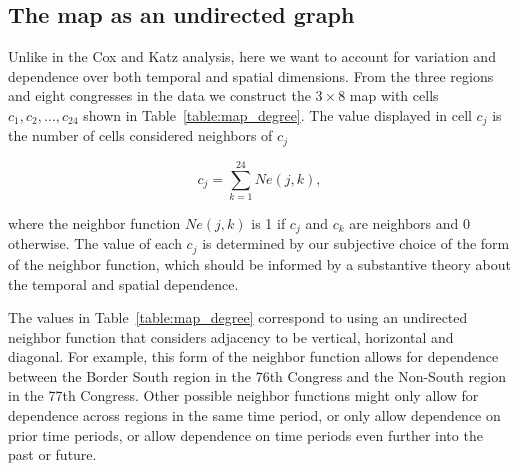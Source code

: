 \subsection{The map as an undirected graph}

Unlike in the Cox and Katz analysis, here we want to account for variation and dependence over both temporal and spatial dimensions. From the three regions and eight congresses in the data we construct the $3 \times 8$ map with cells $c_1,c_2, \dots, c_{24}$ shown in Table~\ref{table:map_degree}. The value displayed in cell $c_{j}$ is the number of cells considered neighbors of $c_{j}$

$$ c_{j} = \sum_{k = 1}^{24} \textit{Ne}(j,k),$$

\noindent where the neighbor function $\textit{Ne}(j,k)$ is 1 if $c_j$ and $c_k$ are neighbors and $0$ otherwise. The value of each $c_j$ is determined by our subjective choice of the form of the neighbor function, which should be informed by a substantive theory about the temporal and spatial dependence. 

The values in Table~\ref{table:map_degree} correspond to using an undirected neighbor function that considers adjacency to be vertical, horizontal and diagonal. For example, this form of the neighbor function allows for dependence between the Border South region in the 76th Congress and the Non-South region in the 77th Congress. Other possible neighbor functions might only allow for dependence across regions in the same time period, or only allow dependence on prior time periods, or allow dependence on time periods even further into the past or future.    



